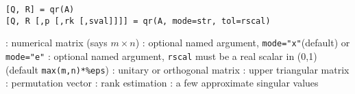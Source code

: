 
\begin{mandesc}
\end{mandesc}

\begin{calling_sequence}
\begin{verbatim}
[Q, R] = qr(A)
[Q, R [,p [,rk [,sval]]]] = qr(A, mode=str, tol=rscal)
\end{verbatim}
\end{calling_sequence}
\begin{parameters}
  \begin{varlist}
     :  numerical matrix (says $m \times n$)
     : optional named argument, \verb+mode="x"+(default) or \verb+mode="e"+
     : optional named argument, \verb+rscal+ must be a real scalar in (0,1) (default \verb+max(m,n)*%eps+)
     : unitary or orthogonal matrix
     : upper triangular matrix
     : permutation vector
     : rank estimation
     : a few approximate singular values
  \end{varlist}
\end{parameters}

